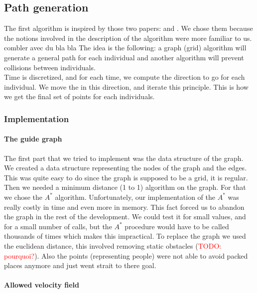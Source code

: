 \subsection{Path generation}

The first algorithm is inspired by those two papers: \cite{PLE} and
\cite{vandenBerg2011}. We chose them because the notions involved in
the description of the algorithm were more familiar to us.  %
combler avec du bla bla The idea is the following: a graph (grid)
algorithm will generate a general path for each individual and another
algorithm will prevent collisions between individuals. \\ Time is
discretized, and for each time, we compute the direction to go for
each individual. We move the in this direction, and iterate this
principle. This is how we get the final set of points for each
individuals.


\subsubsection{Implementation}


\paragraph{The guide graph}

The first part that we tried to implement was the data structure of
the graph. We created a data structure representing the nodes of the
graph and the edges. This was quite easy to do since the graph is
supposed to be a grid, it is regular.  Then we needed a minimum
distance (1 to 1) algorithm on the graph. For that we chose the $A^*$
algorithm. Unfortunately, our implementation of the $A^*$ was really
costly in time and even more in memory. This fact forced us to abandon
the graph in the rest of the development. We could test it for small
values, and for a small number of calls, but the $A^*$ procedure would
have to be called thousands of times which makes this impractical.  To
replace the graph we used the euclidean distance, this involved
removing static obstacles (\textcolor{red}{TODO: pourquoi?}). Also the
points (representing people) were not  able to avoid packed places
anymore and just went strait to there goal.

\paragraph{Allowed velocity field}

